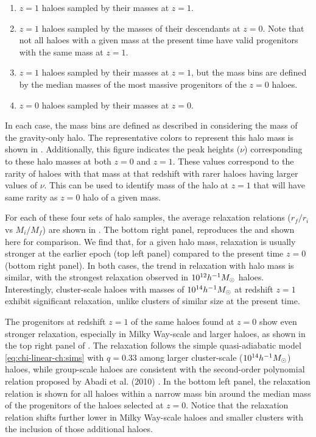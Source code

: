 \begin{enumerate}
    \item $z=1$ haloes sampled by their masses at $z=1$.
    \item $z=1$ haloes sampled by the masses of their descendants at $z=0$. Note that not all haloes with a given mass at the present time have valid progenitors with the same mass at $z=1$.
    \item $z=1$ haloes sampled by their masses at $z=1$, but the mass bins are defined by the median masses of the most massive progenitors of the $z=0$ haloes.
    \item $z=0$ haloes sampled by their masses at $z=0$.
\end{enumerate}

In each case, the mass bins are defined as described in  considering the mass of the gravity-only halo. The representative colors to represent this halo mass is shown in . Additionally, this figure indicates the peak heights ($\nu$) corresponding to these halo masses at both $z=0$ and $z=1$. These values correspond to the rarity of haloes with that mass at that redshift with rarer haloes having larger values of $\nu$. This can be used to identify mass of the halo at $z=1$ that will have same rarity as $z=0$ halo of a given mass. 

For each of these four sets of halo samples, the average relaxation relations ($r_f/r_i$ vs $M_i/M_f$) are shown in . The bottom right panel, reproduces the  and shown here for comparison. We find that, for a given halo mass, relaxation is usually stronger at the earlier epoch (top left panel) compared to the present time $z=0$ (bottom right panel). In both cases, the trend in relaxation with halo mass is similar, with the strongest relaxation observed in $10^{12} h^{-1}M_{\odot}$ haloes. Interestingly, cluster-scale haloes with masses of $10^{14} h^{-1}M_{\odot}$ at redshift $z=1$ exhibit significant relaxation, unlike clusters of similar size at the present time.

The progenitors at redshift $z=1$ of the same haloes found at $z=0$ show even stronger relaxation, especially in Milky Way-scale and larger haloes, as shown in the top right panel of . The relaxation follows the simple quasi-adiabatic model \eqref{eq:chi-linear-ch:sims} with $q=0.33$ among larger cluster-scale ($10^{14} h^{-1}M_{\odot}$) haloes, while group-scale haloes are consistent with the second-order polynomial relation proposed by Abadi et al. (2010) \cite{2010MNRAS.407..435A}. In the bottom left panel, the relaxation relation is shown for all haloes within a narrow mass bin around the median mass of the progenitors of the haloes selected at $z=0$. Notice that the relaxation relation shifts further lower in Milky Way-scale haloes and smaller clusters with the inclusion of those additional haloes.

